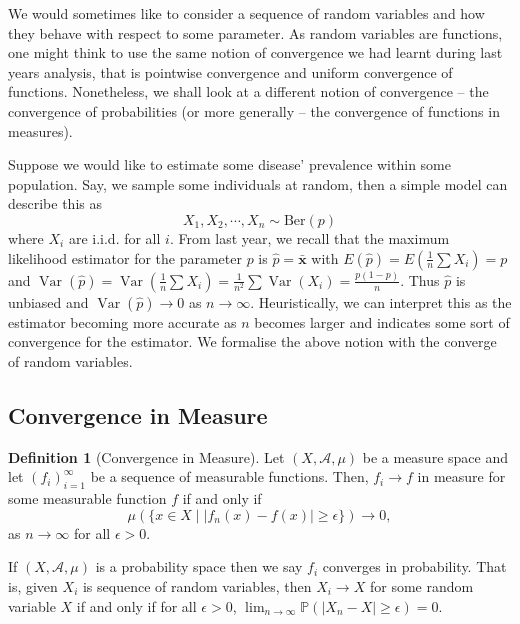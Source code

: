 \documentclass[
]{article}
\theoremstyle{definition}
\newtheorem{definition}{Definition}[section]
\begin{document}
We would sometimes like to consider a sequence of random variables and
how they behave with respect to some parameter. As random variables are
functions, one might think to use the same notion of convergence we had
learnt during last years analysis, that is pointwise convergence and
uniform convergence of functions. Nonetheless, we shall look at a
different notion of convergence -- the convergence of probabilities (or
more generally -- the convergence of functions in measures).

Suppose we would like to estimate some disease' prevalence within some
population. Say, we sample some individuals at random, then a simple
model can describe this as \[X_1, X_2, \cdots, X_n \sim \text{Ber}(p)\]
where \(X_i\) are i.i.d. for all \(i\). From last year, we recall that
the maximum likelihood estimator for the parameter \(p\) is
\(\hat{p} = \bar{\mathbf{x}}\) with
\(E(\hat{p}) = E\left(\frac{1}{n}\sum X_i \right) = p\) and
\(\mathop{\mathrm{Var}}(\hat{p}) = \mathop{\mathrm{Var}}\left(\frac{1}{n} \sum X_i\right) = \frac{1}{n^2} \sum \mathop{\mathrm{Var}}(X_i) = \frac{p(1 - p)}{n}\).
Thus \(\hat{p}\) is unbiased and
\(\mathop{\mathrm{Var}}(\hat{p}) \to 0\) as \(n \to \infty\).
Heuristically, we can interpret this as the estimator becoming more
accurate as \(n\) becomes larger and indicates some sort of convergence
for the estimator. We formalise the above notion with the converge of
random variables.

\hypertarget{convergence-in-measure}{%
\subsection{Convergence in Measure}\label{convergence-in-measure}}

\begin{definition}[Convergence in Measure]
  Let \((X, \mathcal{A}, \mu)\) be a measure space and let
  \((f_i)_{i = 1}^\infty\) be a sequence of measurable functions. Then, 
  \(f_i \to f\) in measure for some measurable function \(f\) if and only if 
  \[\mu(\{x \in X \mid \left| f_n(x) - f(x) \right| \ge \epsilon\}) \to 0,\]
  as \(n \to \infty\) for all \(\epsilon > 0\).
\end{definition}

If \((X, \mathcal{A}, \mu)\) is a probability space then we say \(f_i\)
converges in probability. That is, given \(X_i\) is sequence of random
variables, then \(X_i \to X\) for some random variable \(X\) if and only
if for all \(\epsilon > 0\),
\(\lim_{n \to \infty}\mathbb{P}(\left|X_n - X\right| \ge \epsilon) = 0\).
\end{document}
